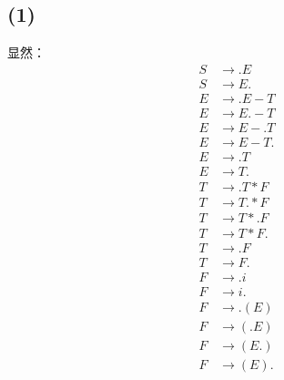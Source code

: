 \documentclass[UTF8]{ctexart}
\begin{document}
    \subsection*{(1)}
        显然：
        \begin{align*}
            S &\to .E \\
            S &\to E. \\
            E &\to .E-T \\
            E &\to E.-T \\
            E &\to E-.T \\
            E &\to E-T. \\
            E &\to .T \\
            E &\to T. \\
            T &\to .T*F \\
            T &\to T.*F \\
            T &\to T*.F \\
            T &\to T*F. \\
            T &\to .F \\
            T &\to F. \\
            F &\to .i \\
            F &\to i. \\
            F &\to .(E) \\
            F &\to (.E) \\
            F &\to (E.) \\
            F &\to (E). \\
        \end{align*}
\end{document}
